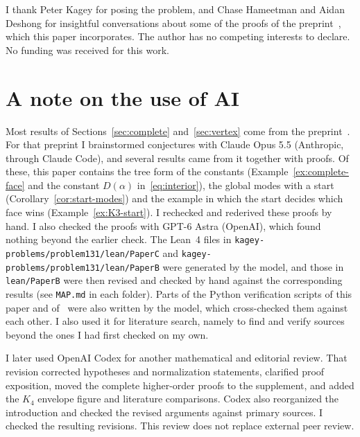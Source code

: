 \documentclass[EJP,preprint]{ejpecp}
\theoremstyle{ejpecpbodyit}
\begin{document}








\appendix





\begin{acks}
I thank Peter Kagey for posing the problem, and Chase Hameetman and Aidan Deshong for
insightful conversations about some of the proofs of the preprint~\cite{paperB}, which this
paper incorporates. The author has no competing interests to declare. No funding was received for
this work.
\end{acks}

\section*{A note on the use of AI}
Most results of Sections~\ref{sec:complete} and~\ref{sec:vertex} come from
the preprint~\cite{paperB}. For that preprint I brainstormed conjectures with Claude Opus 5.5
(Anthropic, through Claude Code), and several results came from it together with proofs. Of these,
this paper contains the tree form of the constants
(Example~\ref{ex:complete-face} and the constant $D(\alpha)$ in~\eqref{eq:interior}), the global
modes with a start (Corollary~\ref{cor:start-modes}) and the example in which the start decides
which face wins (Example~\ref{ex:K3-start}). I rechecked and rederived these proofs by hand. I
also checked the proofs with GPT-6 Astra (OpenAI), which found nothing beyond the earlier check.
The Lean~4 files in \nolinkurl{kagey-problems/problem131/lean/PaperC} and
\nolinkurl{kagey-problems/problem131/lean/PaperB} were generated by the model, and those in
\nolinkurl{lean/PaperB} were then revised and checked by hand against the corresponding results
(see \nolinkurl{MAP.md} in each folder). Parts of the Python verification scripts of this paper and
of~\cite{paperB} were also written by the model, which cross-checked them against each other.
I also used it for literature search, namely to find and verify sources beyond the ones I had
first checked on my own.

I later used OpenAI Codex for another mathematical and editorial review.
That revision corrected hypotheses and normalization statements, clarified
proof exposition, moved the complete higher-order proofs to the supplement,
and added the $K_4$ envelope figure and literature comparisons. Codex also
reorganized the introduction and checked the revised arguments against
primary sources. I checked the resulting revisions. This review does not
replace external peer review.
\end{document}
